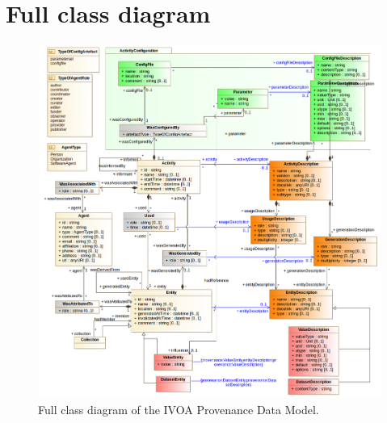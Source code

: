 \documentclass[11pt,a4paper]{ivoa}
\begin{document}
%


\section{Full class diagram}
\label{sec:fulldiagram}

\begin{figure}[h]
\centering
\hspace*{-.13\textwidth} 
\includegraphics[width=1.26\textwidth]{PROV_WD_All.png}
\caption[Full class diagram of the IVOA Provenance Data Model]{Full class diagram of the IVOA Provenance Data Model.}
\label{fig:fulldiagram}
\end{figure}
\end{document}
